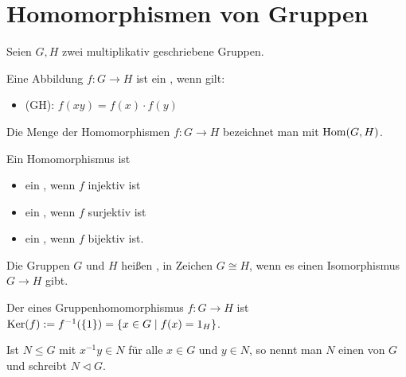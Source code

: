 \section{Homomorphismen von Gruppen}

Seien $G,H$ zwei multiplikativ geschriebene Gruppen.

\begin{definition}[Gruppenhomomorphismus]
	Eine Abbildung $f: G \to H$ ist ein , wenn gilt:
	\begin{itemize}
		\item (GH): $f(xy)=f(x)\cdot f(y)$
	\end{itemize}
	Die Menge der Homomorphismen $f:G\to H$ bezeichnet man mit $\operatorname{Hom}(G,H)$.
\end{definition}

\begin{definition}
	Ein Homomorphismus ist
	\begin{itemize}
		\item ein , wenn $f$ injektiv ist
		\item ein , wenn $f$ surjektiv ist
		\item ein , wenn $f$ bijektiv ist.
	\end{itemize}
	Die Gruppen $G$ und $H$ heißen , in Zeichen $G\cong H$, wenn 
	es einen Isomorphismus $G\to H$ gibt.
\end{definition}

\begin{definition}[Kern]
	Der  eines Gruppenhomomorphismus $f:G\to H$ ist $\operatorname{Ker}(f):= f^{-1}(\{1\})=\{x\in G \mid
	f(x)=1_H\}$.
\end{definition}

\begin{definition}[Normalteiler]
	Ist $N\le G$ mit $x^{-1}y\in N$ für alle $x\in G$ und $y\in N$, so nennt man $N$ 
	einen  von $G$ und schreibt $N\vartriangleleft G$.
\end{definition}